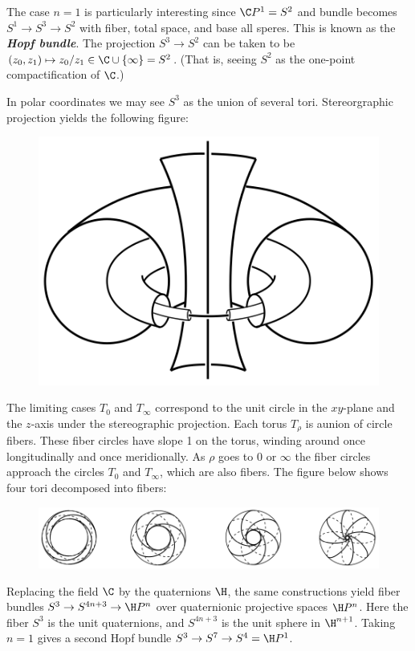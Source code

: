 \begin{remark}
\begin{example}
	The case $n=1$ is particularly interesting since $\C P^1=S^2$ and bundle becomes $S^1\to S^3\to S^2$ with fiber, total space, and base all speres. This is known as the \textbf{\textit{Hopf bundle}}. The projection $S^3\to S^2$ can be taken to be $(z_0,z_1)\mapsto z_0/z_1\in\C\cup\{\infty\}=S^2$. {\color{persiangreen}(That is, seeing $S^2$ as the one-point compactification of $\C$.)}
	
	In polar coordinates we may see $S^3$ as the union of several tori. Stereorgraphic projection yields the following figure:
	\begin{figure}[H]
		\centering
		\includegraphics[width=0.5\linewidth]{hopf-bundle}
		\label{fig:hopf-bundle}
	\end{figure}
	The limiting cases $T_0$ and $T_\infty$ correspond to the unit circle in the $xy$-plane and the $z$-axis under the stereographic projection.	Each torus $T_\rho$ is aunion of circle fibers. These fiber circles have slope 1 on the torus, winding around once longitudinally and once meridionally. As $\rho$ goes to $0$ or $\infty$ the fiber circles approach the circles $T_0$ and $T_\infty$, which are also fibers. The figure below shows four tori decomposed into fibers:
	\begin{figure}[H]
		\centering
		\includegraphics[width=0.9\linewidth]{hopf-bundle2}
		\label{fig:hopf-bundle2}
	\end{figure}
	
	Replacing the field $\C$ by the quaternions $\H$, the same constructions yield fiber bundles $S^3\to S^{4n+3}\to\H P^{n}$ over quaternionic projective spaces $\H P^n$. Here the fiber $S^3$ is the unit quaternions, and $S^{4n+3}$ is the unit sphere in $\H^{n+1}$. Taking $n=1$ gives a second Hopf bundle $S^3\to S^7\to S^4=\H P^1$.
	

\end{example}
\end{remark}
